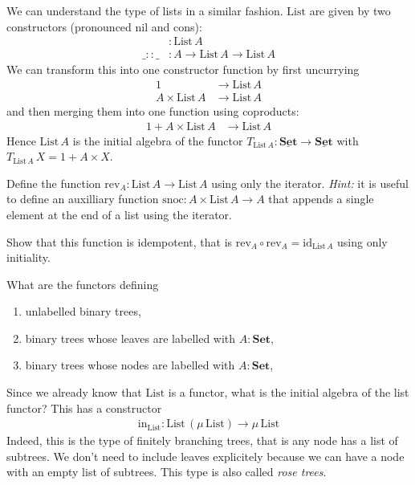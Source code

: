 \documentclass{article}
\newcommand{\Set}{\mathbf{Set}}
\newcommand{\cat}[1]{\underline{\mathbf{#1}}}
\newcommand{\id}{\mathrm{id}}
\newcommand{\List}{\mathrm{List}}
\newcommand{\rev}{\mathrm{rev}}
\newcommand{\inn}{\mathrm{in}}
\newcommand{\cons}{:\!\!:}
\begin{document}
We can understand the type of lists in a similar fashion. $\List$ are given by two constructors (pronounced nil and cons):
\begin{align*}
[] & : \List\,A \\
\_\cons\_ & : A \to \List\,A \to \List\,A
\end{align*}
We can transform this into one constructor function by first uncurrying
\begin{align*}
1 & \to \List\,A \\
A \times \List\,A & \to \List\,A
\end{align*}
and then merging them into one function using coproducts:
\begin{align*}
1 + A \times \List\,A & \to \List\,A
\end{align*}
Hence $\List\,A$ is the initial algebra of the functor $T_{\List\,A}:\cat{\Set} \to \cat{\Set}$ with $T_{\List\,A}\,X = 1 + A \times X$.
\begin{Exercise}
Define the function $\rev_A : \List\,A \to \List\,A$ using only the iterator. \emph{Hint:} it is useful to define an auxilliary function 
$\mathrm{snoc} : A \times\List\,A \to A$ that appends a single element at the end of a list using the iterator. 

Show that this function is idempotent, that is $\rev_A \circ \rev_A = \id_{\List\,A}$ using only initiality. 
\end{Exercise}

\begin{Exercise}
What are the functors defining 
\begin{enumerate}
\item unlabelled binary trees,
\item binary trees whose leaves are labelled with $A:\Set$,
\item binary trees whose nodes  are labelled with $A:\Set$,
\end{enumerate}
\end{Exercise}

Since we already know that $\List$ is a functor, what is the initial algebra of the list functor? This has a constructor
\begin{align*}
\inn_\List : \List \,(\mu\,\List) \to \mu\,\List
\end{align*}
Indeed, this is the type of finitely branching trees, that is any node has a list of subtrees. We don't need to include leaves explicitely because we can have a node with an empty list of subtrees. This type is also called \emph{rose trees}.
\end{document}
